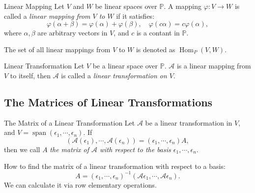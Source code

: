 \begin{definition}{Linear Mapping}{}
  Let $V$ and $W$ be linear spaces over $\mathbb{P}$.
  A mapping $\varphi: V \rightarrow W$ is called a \emph{linear mapping from $V$
  to $W$}
  if it satisfies:
  \begin{equation}
    \varphi(\alpha + \beta) = \varphi(\alpha) + \varphi(\beta), \quad
    \varphi(c \alpha) = c \varphi(\alpha),
  \end{equation}
  where $\alpha, \beta$ are arbitrary vectors in $V$,
  and $c$ is a contant in $\mathbb{P}$.
\end{definition}

\begin{note}
  The set of all linear mappings from $V$ to $W$ is denoted as $\operatorname{Hom}_P(V, W)$.
\end{note}

\begin{definition}{Linear Transformation}{}
  Let $V$ be a linear space over $\mathbb{P}$.
  $\mathcal{A}$ is a linear mapping from $V$ to itself,
  then $\mathcal{A}$ is called a \emph{linear transformation on $V$}.
\end{definition}


\subsection{The Matrices of Linear Transformations}

\begin{definition}{The Matrix of a Linear Transformation}{}
  Let $\mathcal{A}$ be a linear transformation in $V$,
  and $V = \operatorname{span} (\epsilon_1,\cdots,\epsilon_n)$.
  If
  \begin{equation}
    (\mathcal{A}(\epsilon_1),\cdots,\mathcal{A}(\epsilon_n)) = (\epsilon_1,\cdots,\epsilon_n)A,
  \end{equation}
  then we call $A$ \emph{the matrix of $\mathcal{A}$ with respect to the basis $\epsilon_1,\cdots,\epsilon_n$}.
\end{definition}

\begin{note}
  How to find the matrix of a linear transformation with respect to a basis:
  \begin{equation}
    A = (\epsilon_1,\cdots,\epsilon_n)^{-1}(\mathcal{A}\epsilon_1,\cdots,\mathcal{A}\epsilon_n).
  \end{equation}
  We can calculate it via row elementary operations.
\end{note}

